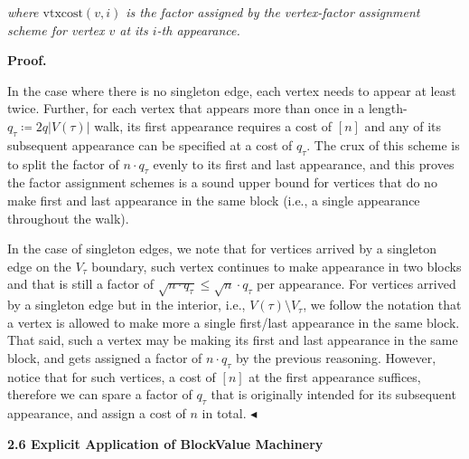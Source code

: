 \documentclass[10pt,a4paper]{article}
\begin{document}
\emph{where $\text{vtxcost}(v,i)$ is the factor assigned by the vertex-factor assignment scheme for vertex $v$ at its $i$-th appearance.}\par






\par\medskip\noindent\textbf{Proof.}\par




In the case where there is no singleton edge, each vertex needs to appear at least twice. Further, for each vertex that appears more than once in a length-$q_{\tau}\coloneqq 2q|V(\tau)|$ walk, its first appearance requires a cost of $[n]$ and any of its subsequent appearance can be specified at a cost of $q_{\tau}$. The crux of this scheme is to split the factor of $n\cdot q_{\tau}$ evenly to its first and last appearance, and this proves the factor assignment schemes is a sound upper bound for vertices that do no make first and last appearance in the same block (i.e., a single appearance throughout the walk).\par




In the case of singleton edges, we note that for vertices arrived by a singleton edge on the $V_{\tau}$ boundary, such vertex continues to make appearance in two blocks and that is still a factor of $\sqrt{n\cdot q_{\tau}}\leq\sqrt{n}\cdot q_{\tau}$ per appearance. For vertices arrived by a singleton edge but in the interior, i.e., $V(\tau)\setminus V_{\tau}$, we follow the notation that a vertex is allowed to make more a single first/last appearance in the same block. That said, such a vertex may be making its first and last appearance in the same block, and gets assigned a factor of $n\cdot q_{\tau}$ by the previous reasoning. However, notice that for such vertices, a cost of $[n]$ at the first appearance suffices, therefore we can spare a factor of $q_{\tau}$ that is originally intended for its subsequent appearance, and assign a cost of $n$ in total.
$\blacktriangleleft$\par







\par\medskip\noindent\textbf{
2.6 Explicit Application of BlockValue Machinery}\par
\end{document}

